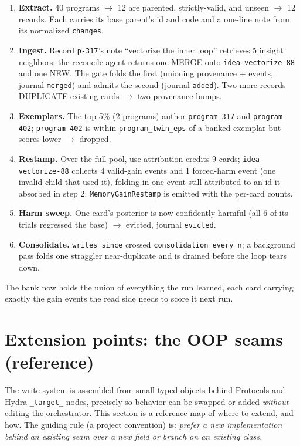 \documentclass[11pt]{article}
\newcommand{\code}[1]{\texttt{\small #1}}
\begin{document}
\begin{enumerate}[leftmargin=1.6em, itemsep=2pt]
  \item \textbf{Extract.} 40 programs $\to$ 12 are parented, strictly-valid, and
    unseen $\to$ 12 records. Each carries its base parent's id and code and a
    one-line note from its normalized \code{changes}.
  \item \textbf{Ingest.} Record \code{p-317}'s note ``vectorize the inner loop''
    retrieves 5 insight neighbors; the reconcile agent returns one MERGE onto
    \code{idea-vectorize-88} and one NEW. The gate folds the first (unioning
    provenance $+$ events, journal \code{merged}) and admits the second (journal
    \code{added}). Two more records DUPLICATE existing cards $\to$ two provenance
    bumps.
  \item \textbf{Exemplars.} The top 5\% (2 programs) author \code{program-317}
    and \code{program-402}; \code{program-402} is within \code{program\_twin\_eps}
    of a banked exemplar but scores lower $\to$ dropped.
  \item \textbf{Restamp.} Over the full pool, use-attribution credits 9 cards;
    \code{idea-vectorize-88} collects 4 valid-gain events and 1 forced-harm event
    (one invalid child that used it), folding in one event still attributed to an
    id it absorbed in step 2. \code{MemoryGainRestamp} is emitted with the
    per-card counts.
  \item \textbf{Harm sweep.} One card's posterior is now confidently harmful
    (all 6 of its trials regressed the base) $\to$ evicted, journal \code{evicted}.
  \item \textbf{Consolidate.} \code{writes\_since} crossed
    \code{consolidation\_every\_n}; a background pass folds one straggler
    near-duplicate and is drained before the loop tears down.
\end{enumerate}

The bank now holds the union of everything the run learned, each card carrying
exactly the gain events the read side needs to score it next run.

\section{Extension points: the OOP seams (reference)}
\label{sec:extensions}

The write system is assembled from small typed objects behind Protocols and
Hydra \code{\_target\_} nodes, precisely so behavior can be swapped or added
\emph{without} editing the orchestrator. This section is a reference map of where
to extend, and how. The guiding rule (a project convention) is: \emph{prefer a
new implementation behind an existing seam over a new field or branch on an
existing class.}
\end{document}
